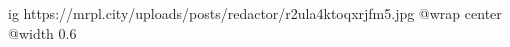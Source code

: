  
 
 
 
 

\ifcmt
  ig https://mrpl.city/uploads/posts/redactor/r2ula4ktoqxrjfm5.jpg
  @wrap center
  @width 0.6
\fi
